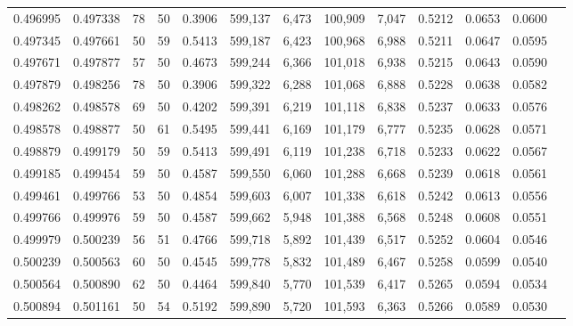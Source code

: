 \begin{tabular}{rrrrrrrrrrrrr}
0.496995 & 0.497338 &    78 &  50 &                                     0.3906 & 599,137 &   6,473 & 100,909 &   7,047 & 0.5212 & 0.0653 & 0.0600 \\
0.497345 & 0.497661 &    50 &  59 &                                     0.5413 & 599,187 &   6,423 & 100,968 &   6,988 & 0.5211 & 0.0647 & 0.0595 \\
0.497671 & 0.497877 &    57 &  50 &                                     0.4673 & 599,244 &   6,366 & 101,018 &   6,938 & 0.5215 & 0.0643 & 0.0590 \\
0.497879 & 0.498256 &    78 &  50 &                                     0.3906 & 599,322 &   6,288 & 101,068 &   6,888 & 0.5228 & 0.0638 & 0.0582 \\
0.498262 & 0.498578 &    69 &  50 &                                     0.4202 & 599,391 &   6,219 & 101,118 &   6,838 & 0.5237 & 0.0633 & 0.0576 \\
0.498578 & 0.498877 &    50 &  61 &                                     0.5495 & 599,441 &   6,169 & 101,179 &   6,777 & 0.5235 & 0.0628 & 0.0571 \\
0.498879 & 0.499179 &    50 &  59 &                                     0.5413 & 599,491 &   6,119 & 101,238 &   6,718 & 0.5233 & 0.0622 & 0.0567 \\
0.499185 & 0.499454 &    59 &  50 &                                     0.4587 & 599,550 &   6,060 & 101,288 &   6,668 & 0.5239 & 0.0618 & 0.0561 \\
0.499461 & 0.499766 &    53 &  50 &                                     0.4854 & 599,603 &   6,007 & 101,338 &   6,618 & 0.5242 & 0.0613 & 0.0556 \\
0.499766 & 0.499976 &    59 &  50 &                                     0.4587 & 599,662 &   5,948 & 101,388 &   6,568 & 0.5248 & 0.0608 & 0.0551 \\
0.499979 & 0.500239 &    56 &  51 &                                     0.4766 & 599,718 &   5,892 & 101,439 &   6,517 & 0.5252 & 0.0604 & 0.0546 \\
0.500239 & 0.500563 &    60 &  50 &                                     0.4545 & 599,778 &   5,832 & 101,489 &   6,467 & 0.5258 & 0.0599 & 0.0540 \\
0.500564 & 0.500890 &    62 &  50 &                                     0.4464 & 599,840 &   5,770 & 101,539 &   6,417 & 0.5265 & 0.0594 & 0.0534 \\
0.500894 & 0.501161 &    50 &  54 &                                     0.5192 & 599,890 &   5,720 & 101,593 &   6,363 & 0.5266 & 0.0589 & 0.0530 \\

\end{tabular}
